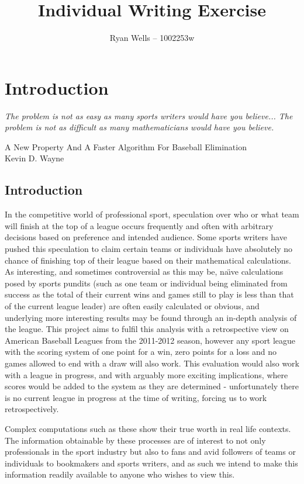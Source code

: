 \documentclass{report}
\title{Individual Writing Exercise}
\author{Ryan Wells -- 1002253w}
\begin{document}
\maketitle
\section*{Introduction}

\emph{The problem is not as easy as many sports writers would have you believe... The problem is not as difficult as many mathematicians would have you believe.}

A New Property And A Faster Algorithm For Baseball Elimination\\
Kevin D. Wayne\cite{Wayne}\\
\subsection*{Introduction}
In the competitive world of professional sport, speculation over who or what team will finish at the top of a league occurs frequently and often with arbitrary decisions based on preference and intended audience. Some sports writers have pushed this speculation to claim certain teams or individuals have absolutely no chance of finishing top of their league based on their mathematical calculations. As interesting, and sometimes controversial as this may be, na\"{\i}ve calculations posed by sports pundits (such as one team or individual being eliminated from success as the total of their current wins and games still to play is less than that of the current league leader) are often easily calculated or obvious, and underlying more interesting results may be found through an in-depth analysis of the league. This project aims to fulfil this analysis with a retrospective view on American Baseball Leagues from the 2011-2012 season, however any sport league with the scoring system of one point for a win, zero points for a loss and no games allowed to end with a draw will also work. This evaluation would also work with a league in progress, and with arguably more exciting implications, where scores would be added to the system as they are determined - unfortunately there is no current league in progress at the time of writing, forcing us to work retrospectively. 

Complex computations such as these show their true worth in real life contexts. The information obtainable by these processes are of interest to not only professionals in the sport industry but also to fans and avid followers of teams or individuals to bookmakers and sports writers, and as such we intend to make this information readily available to anyone who wishes to view this. 
\end{document}
